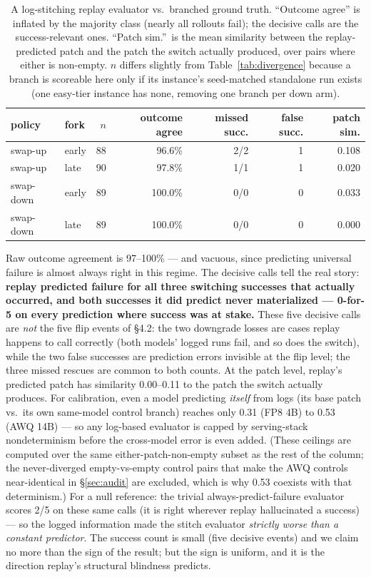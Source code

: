 \documentclass{article}
\begin{document}
\begin{table}[t]
\centering
\small
\begin{tabular}{llrrrrr}
\toprule
policy & fork & $n$ & outcome agree & missed succ. & false succ. & patch sim. \\
\midrule
swap-up   & early & 88 & 96.6\% & 2/2 & 1 & 0.108 \\
swap-up   & late  & 90 & 97.8\% & 1/1 & 1 & 0.020 \\
swap-down & early & 89 & 100.0\% & 0/0 & 0 & 0.033 \\
swap-down & late  & 89 & 100.0\% & 0/0 & 0 & 0.000 \\
\bottomrule
\end{tabular}
\caption{A log-stitching replay evaluator vs.\ branched ground truth. ``Outcome agree'' is inflated by the majority class (nearly all rollouts fail); the decisive calls are the success-relevant ones. ``Patch sim.''\ is the mean similarity between the replay-predicted patch and the patch the switch actually produced, over pairs where either is non-empty. $n$ differs slightly from Table~\ref{tab:divergence} because a branch is scoreable here only if its instance's seed-matched standalone run exists (one easy-tier instance has none, removing one branch per down arm).}
\label{tab:stitch}
\end{table}

Raw outcome agreement is 97--100\% --- and vacuous, since predicting universal failure is almost always right in this regime. The decisive calls tell the real story: \textbf{replay predicted failure for all three switching successes that actually occurred, and both successes it did predict never materialized --- 0-for-5 on every prediction where success was at stake.} These five decisive calls are \emph{not} the five flip events of \S4.2: the two downgrade losses are cases replay happens to call correctly (both models' logged runs fail, and so does the switch), while the two false successes are prediction errors invisible at the flip level; the three missed rescues are common to both counts. At the patch level, replay's predicted patch has similarity 0.00--0.11 to the patch the switch actually produces. For calibration, even a model predicting \emph{itself} from logs (its base patch vs.\ its own same-model control branch) reaches only 0.31 (FP8 4B) to 0.53 (AWQ 14B) --- so any log-based evaluator is capped by serving-stack nondeterminism before the cross-model error is even added. (These ceilings are computed over the same either-patch-non-empty subset as the rest of the column; the never-diverged empty-vs-empty control pairs that make the AWQ controls near-identical in \S\ref{sec:audit} are excluded, which is why 0.53 coexists with that determinism.) For a null reference: the trivial always-predict-failure evaluator scores 2/5 on these same calls (it is right wherever replay hallucinated a success) --- so the logged information made the stitch evaluator \emph{strictly worse than a constant predictor}. The success count is small (five decisive events) and we claim no more than the sign of the result; but the sign is uniform, and it is the direction replay's structural blindness predicts.
\end{document}
